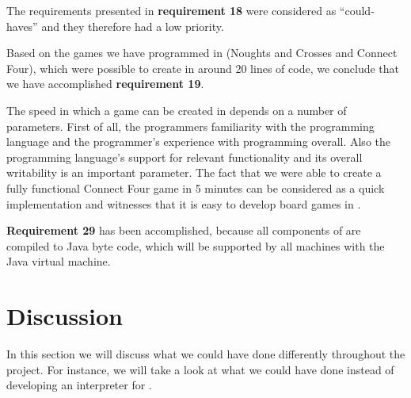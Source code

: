 The requirements presented in \textbf{requirement 18} were considered as
``could-haves'' and they therefore had a low priority.

Based on the games we have programmed in \productname{} (Noughts and Crosses
and Connect Four), which were possible to create in around 20 lines of code, we
conclude that we have accomplished \textbf{requirement 19}.

The speed in which a game can be created in \productname{} depends on a number
of parameters. First of all, the programmers familiarity with the programming
language and the programmer's experience with programming overall. Also the
programming language's support for relevant functionality and its overall
writability is an important parameter. The fact that we were able to create a
fully functional Connect Four game in 5 minutes can be considered as a quick
implementation and witnesses that it is easy to develop board games in
\productname{}.

\textbf{Requirement 29} has been accomplished, because all components of
\productname{} are compiled to Java byte code, which will be supported by all
machines with the Java virtual machine.

\section{Discussion}
\label{sec:discussion}

In this section we will discuss what we could have done differently throughout
the project. For instance, we will take a look at what we could have done
instead of developing an interpreter for \productname{}.








